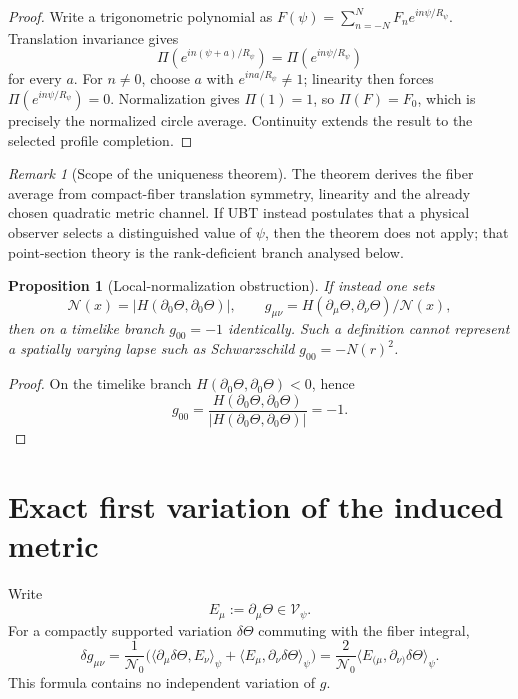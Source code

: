 \documentclass[11pt,a4paper]{article}
\newtheorem{proposition}[definition]{Proposition}
\theoremstyle{remark}
\newtheorem{remark}[definition]{Remark}
\newcommand{\Nzero}{\mathcal N_0}
\begin{document}
\begin{proof}
Write a trigonometric polynomial as
$F(\psi)=\sum_{n=-N}^{N}F_n e^{in\psi/R_\psi}$.  Translation invariance gives
\begin{equation}
 \Pi(e^{in(\psi+a)/R_\psi})=\Pi(e^{in\psi/R_\psi})
\end{equation}
for every $a$.  For $n\ne0$, choose $a$ with
$e^{ina/R_\psi}\ne1$; linearity then forces
$\Pi(e^{in\psi/R_\psi})=0$.  Normalization gives $\Pi(1)=1$, so
$\Pi(F)=F_0$, which is precisely the normalized circle average.  Continuity
extends the result to the selected profile completion.
\end{proof}

\begin{remark}[Scope of the uniqueness theorem]
The theorem derives the fiber average from compact-fiber translation symmetry,
linearity and the already chosen quadratic metric channel.  If UBT instead
postulates that a physical observer selects a distinguished value of $\psi$,
then the theorem does not apply; that point-section theory is the rank-deficient
branch analysed below.
\end{remark}

\begin{proposition}[Local-normalization obstruction]
If instead one sets
\begin{equation}
  \mathcal N(x)=\left|H(\partial_0\Theta,\partial_0\Theta)\right|,
  \qquad
  g_{\mu\nu}=H(\partial_\mu\Theta,\partial_\nu\Theta)/\mathcal N(x),
\end{equation}
then on a timelike branch $g_{00}=-1$ identically.  Such a definition cannot
represent a spatially varying lapse such as Schwarzschild $g_{00}=-N(r)^2$.
\end{proposition}

\begin{proof}
On the timelike branch $H(\partial_0\Theta,\partial_0\Theta)<0$, hence
\begin{equation}
 g_{00}=\frac{H(\partial_0\Theta,\partial_0\Theta)}
 {|H(\partial_0\Theta,\partial_0\Theta)|}=-1.
\end{equation}
\end{proof}

\section{Exact first variation of the induced metric}

Write
\begin{equation}
  E_\mu:=\partial_\mu\Theta\in\mathscr V_\psi.
\end{equation}
For a compactly supported variation $\delta\Theta$ commuting with the fiber
integral,
\begin{equation}
  \boxed{
  \delta g_{\mu\nu}
  =\frac1{\Nzero}
  \bigl(
   \langle\partial_\mu\delta\Theta,E_\nu\rangle_\psi
  +\langle E_\mu,\partial_\nu\delta\Theta\rangle_\psi
  \bigr)
  =\frac2{\Nzero}
  \langle E_{(\mu},\partial_{\nu)}\delta\Theta\rangle_\psi.}
  \label{eq:deltag}
\end{equation}
This formula contains no independent variation of $g$.
\end{document}
